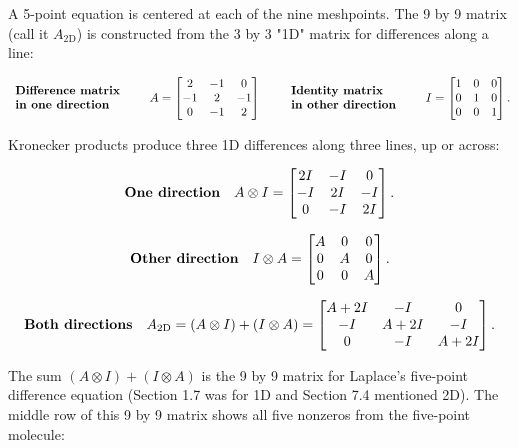 A 5-point equation is centered at each of the nine meshpoints. The 9 by 9 matrix (call it \(A_{\text{2D}}\)) is constructed from the 3 by 3 "1D" matrix for differences along a line:

\[\begin{array}{ll}\text{\bf Difference matrix}\\ \text{\bf in one direction}\end{array}\qquad A=\begin{bmatrix}2&-1&0\\ -1&2&-1\\ 0&-1&2\end{bmatrix}\qquad\begin{array}{ll}\text{\bf Identity matrix}\\ \text{\bf in other direction}\end{array}\qquad I=\begin{bmatrix}1&0&0\\ 0&1&0\\ 0&0&1\end{bmatrix}.\]

Kronecker products produce three 1D differences along three lines, up or across:

\[\begin{array}{ll}\text{\bf One direction}&A\otimes I=\begin{bmatrix}2I&-I&0\\ -I&2I&-I\\ 0&-I&2I\end{bmatrix}.\end{array}\]

\[\begin{array}{ll}\text{\bf Other direction}&I\otimes A=\begin{bmatrix}A&0&0\\ 0&A&0\\ 0&0&A\end{bmatrix}.\end{array}\]

\[\begin{array}{ll}\text{\bf Both directions}&A_{\text{2D}}=(A\otimes I)+(I \otimes A)=\begin{bmatrix}A+2I&-I&0\\ -I&A+2I&-I\\ 0&-I&A+2I\end{bmatrix}.\end{array}\]

The sum \((A\otimes I)+(I\otimes A)\) is the 9 by 9 matrix for Laplace's five-point difference equation (Section 1.7 was for 1D and Section 7.4 mentioned 2D). The middle row of this 9 by 9 matrix shows all five nonzeros from the five-point molecule:

